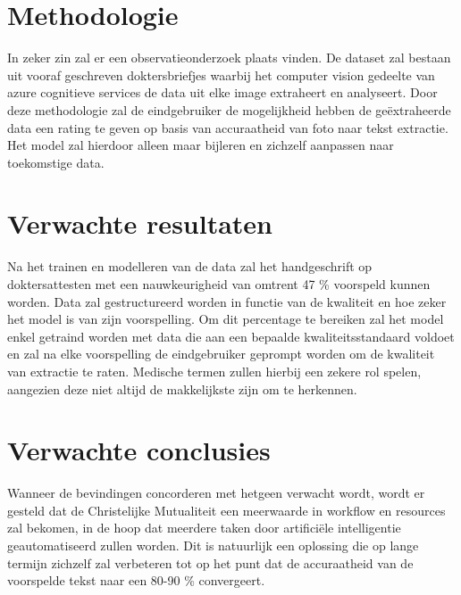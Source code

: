


\section{Methodologie}
\label{sec:methodologie}
In zeker zin zal er een observatieonderzoek plaats vinden. De dataset zal bestaan uit vooraf geschreven doktersbriefjes waarbij het computer vision gedeelte van azure cognitieve services de data uit elke image extraheert en analyseert. Door deze methodologie zal de eindgebruiker de mogelijkheid hebben de geëxtraheerde data een rating te geven op basis van accuraatheid van foto naar tekst extractie. Het model zal hierdoor alleen maar bijleren en zichzelf aanpassen naar toekomstige data. 


\section{Verwachte resultaten}
\label{sec:verwachte_resultaten}
Na het trainen en modelleren van de data zal het handgeschrift op doktersattesten met een nauwkeurigheid van omtrent 47 \% voorspeld kunnen worden. Data zal gestructureerd worden in functie van de kwaliteit en hoe zeker het model is van zijn voorspelling. Om dit percentage te bereiken zal het model enkel getraind worden met data die aan een bepaalde kwaliteitsstandaard voldoet en zal na elke voorspelling de eindgebruiker geprompt worden om de kwaliteit van extractie te raten. Medische termen zullen hierbij een zekere rol spelen, aangezien deze niet altijd de makkelijkste zijn om te herkennen. 


\section{Verwachte conclusies}
\label{sec:verwachte_conclusies}
Wanneer de bevindingen concorderen met hetgeen verwacht wordt, wordt er gesteld dat de Christelijke Mutualiteit een meerwaarde in workflow en resources zal bekomen, in de hoop dat meerdere taken door artificiële intelligentie geautomatiseerd zullen worden. Dit is natuurlijk een oplossing die op lange termijn zichzelf zal verbeteren tot op het punt dat de accuraatheid van de voorspelde tekst naar een 80-90 \% convergeert.  

